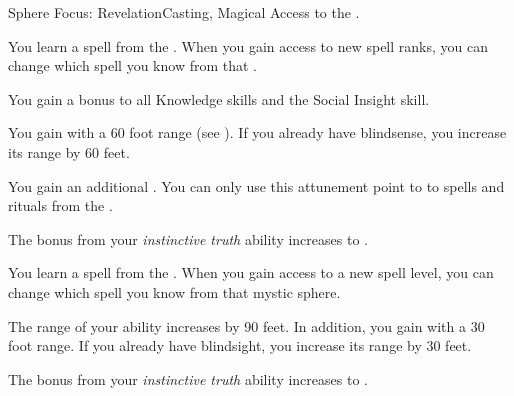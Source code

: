     \begin{feat}{Sphere Focus: Revelation}{Casting, Magical}
        \featpre Access to the  .

         You learn a spell from the  .
        When you gain access to new spell ranks, you can change which spell you know from that .

         You gain a  bonus to all Knowledge skills and the Social Insight skill.

         You gain  with a 60 foot range (see ).
        If you already have blindsense, you increase its range by 60 feet.

         You gain an additional .
        You can only use this attunement point to  to spells and rituals from the  .

         The bonus from your \textit{instinctive truth} ability increases to .

         You learn a spell from the  .
        When you gain access to a new spell level, you can change which spell you know from that mystic sphere.

         The range of your  ability increases by 90 feet.
        In addition, you gain  with a 30 foot range.
        If you already have blindsight, you increase its range by 30 feet.

         The bonus from your \textit{instinctive truth} ability increases to .
    \end{feat}

